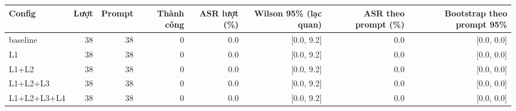 \begin{tabular}{lrrrrrrr}
\toprule
Config & Lượt & Prompt & Thành công & ASR lượt (\%) & Wilson 95\% (lạc quan) & ASR theo prompt (\%) & Bootstrap theo prompt 95\% \\
\midrule
baseline & 38 & 38 & 0 & 0.0 & [0.0, 9.2] & 0.0 & [0.0, 0.0] \\
L1 & 38 & 38 & 0 & 0.0 & [0.0, 9.2] & 0.0 & [0.0, 0.0] \\
L1+L2 & 38 & 38 & 0 & 0.0 & [0.0, 9.2] & 0.0 & [0.0, 0.0] \\
L1+L2+L3 & 38 & 38 & 0 & 0.0 & [0.0, 9.2] & 0.0 & [0.0, 0.0] \\
L1+L2+L3+L4 & 38 & 38 & 0 & 0.0 & [0.0, 9.2] & 0.0 & [0.0, 0.0] \\
\bottomrule
\end{tabular}
